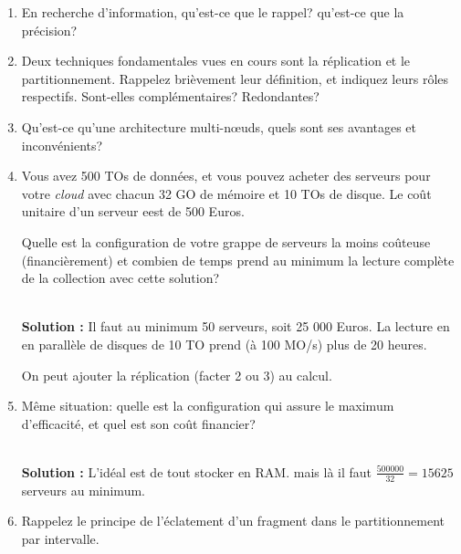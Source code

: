 \documentclass[11pt,a4paper]{article}
\newenvironment{solution}[0]{
~\\ \color{red} \textbf{Solution :}\color{black}}{%
}
\begin{document}
\begin{enumerate}

  \item En recherche d'information, qu'est-ce que le rappel? qu'est-ce que la précision?
  
  \item Deux techniques fondamentales vues en cours sont la réplication et le partitionnement.
     Rappelez brièvement leur définition, et indiquez leurs rôles respectifs. Sont-elles complémentaires? Redondantes?
       
  \item Qu'est-ce qu'une architecture multi-nœuds, quels sont ses avantages et inconvénients?
        
  \item Vous avez 500 TOs de données, et vous pouvez acheter des serveurs pour votre \textit{cloud}
        avec chacun 32 GO de mémoire et 
      10 TOs de disque. Le coût unitaire d'un serveur eest de 500 Euros.
      
      Quelle est la configuration de votre grappe de serveurs la moins coûteuse (financièrement) et combien de temps prend
      au minimum la lecture complète de la collection avec cette solution?
      
      \begin{solution}
      Il faut au minimum 50 serveurs, soit 25 000 Euros. La lecture en en parallèle 
      de disques de 10 TO prend (à 100 MO/s) plus de 20 heures.
      
      On peut ajouter la réplication (facter 2 ou 3) au calcul.
      \end{solution}
      
   \item Même situation:   quelle est la configuration qui assure le maximum d'efficacité, et quel est son coût financier?
       
      \begin{solution}
      L'idéal est de tout stocker en RAM. mais là il faut $\frac{500 000}{32} = 15 625$ serveurs
      au minimum.
      \end{solution}
       
    \item Rappelez le principe de l'éclatement d'un fragment dans le partitionnement par intervalle.
\end{enumerate}
\end{document}
